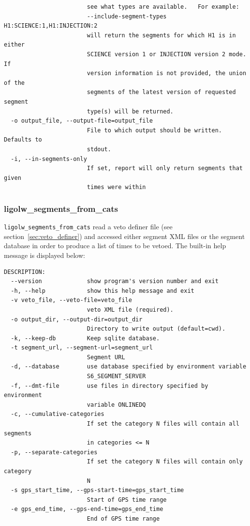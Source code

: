 {\begin{verbatim}
                        see what types are available.   For example:
                        --include-segment-types H1:SCIENCE:1,H1:INJECTION:2
                        will return the segments for which H1 is in either
                        SCIENCE version 1 or INJECTION version 2 mode. If
                        version information is not provided, the union of the
                        segments of the latest version of requested segment
                        type(s) will be returned.
  -o output_file, --output-file=output_file
                        File to which output should be written.  Defaults to
                        stdout.
  -i, --in-segments-only
                        If set, report will only return segments that given
                        times were within
\end{verbatim}
}



\subsubsection{ligolw\_segments\_from\_cats}
\label{ssec:from_cats}

\texttt{ligolw\_segments\_from\_cats} read a veto definer file (see
section~\ref{sec:veto_definer}) and accessed either segment XML files
or the segment database in order to produce a list of times to be
vetoed.  The built-in help message is displayed below:
%
{\small
\begin{verbatim}
DESCRIPTION:
  --version             show program's version number and exit
  -h, --help            show this help message and exit
  -v veto_file, --veto-file=veto_file
                        veto XML file (required).
  -o output_dir, --output-dir=output_dir
                        Directory to write output (default=cwd).
  -k, --keep-db         Keep sqlite database.
  -t segment_url, --segment-url=segment_url
                        Segment URL
  -d, --database        use database specified by environment variable
                        S6_SEGMENT_SERVER
  -f, --dmt-file        use files in directory specified by environment
                        variable ONLINEDQ
  -c, --cumulative-categories
                        If set the category N files will contain all segments
                        in categories <= N
  -p, --separate-categories
                        If set the category N files will contain only category
                        N
  -s gps_start_time, --gps-start-time=gps_start_time
                        Start of GPS time range
  -e gps_end_time, --gps-end-time=gps_end_time
                        End of GPS time range
\end{verbatim}
}

